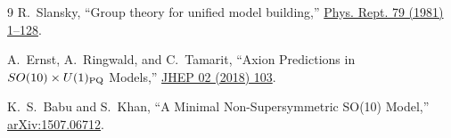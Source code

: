 \documentclass[11pt]{article}
\begin{document}
\begin{thebibliography}{9}
R.~Slansky, ``Group theory for unified model building,''
\href{https://doi.org/10.1016/0370-1573(81)90092-2}{Phys. Rept. 79 (1981) 1--128}.

A.~Ernst, A.~Ringwald, and C.~Tamarit,
``Axion Predictions in $SO(10)\times U(1)_{\rm PQ}$ Models,''
\href{https://arxiv.org/abs/1801.04906}{JHEP 02 (2018) 103}.

K.~S.~Babu and S.~Khan,
``A Minimal Non-Supersymmetric SO(10) Model,''
\href{https://arxiv.org/abs/1507.06712}{arXiv:1507.06712}.
\end{thebibliography}
\end{document}

